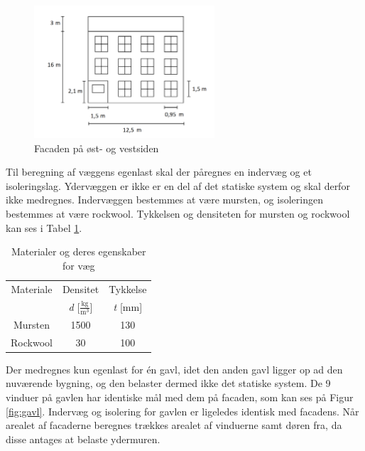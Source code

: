 \begin{figure}[H]
	\centering
	\includegraphics[width=0.6\textwidth]{billeder/facadenord.png}
	\caption{Facaden på øst- og vestsiden}
	\label{fig:facade}
\end{figure}

Til beregning af væggens egenlast skal der påregnes en indervæg og et isoleringslag. Ydervæggen er ikke er en del af det statiske system og skal derfor ikke medregnes. Indervæggen bestemmes at være mursten, og isoleringen bestemmes at være rockwool. Tykkelsen og densiteten for mursten og rockwool kan ses i Tabel \ref{tab:murogwool}.

\begin{table}
	\begin{center}
		\begin{tabular}{c c c}
			\hline
			Materiale & Densitet & Tykkelse \\ 
			& \textit{d} [$\frac{\text{kg}}{\text{m}^3}$] & \textit{t} [mm] \\ \hline
			Mursten  & 1500  & 130     \\ 
			Rockwool & 30 & 100              \\ 
		\end{tabular}
		\caption{Materialer og deres egenskaber for væg \citep{murstendensitet} \citep{indervaeg} \citep{densitet} \citep{isolering}}
		\label{tab:murogwool}
	\end{center}
\end{table}

Der medregnes kun egenlast for én gavl, idet den anden gavl ligger op ad den nuværende bygning, og den belaster dermed ikke det statiske system. 
\newline \indent{     }  De 9 vinduer på gavlen har identiske mål med dem på facaden, som kan ses på Figur \ref{fig:gavl}. Indervæg og isolering for gavlen er ligeledes identisk med facadens.
\newline \indent{     }  Når arealet af facaderne beregnes trækkes arealet af vinduerne samt døren fra, da disse antages at belaste ydermuren.

